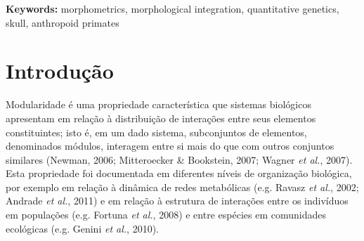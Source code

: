 \documentclass[12pt,twoside]{report}
\renewcommand{\headrulewidth}{0pt}%
\begin{document}
\begin{small}

\end{small}

\noindent
\par
\vspace{1em}
\noindent\textbf{Keywords:} morphometrics, morphological integration, quantitative genetics, skull, anthropoid primates


\newpage

\tableofcontents
{\footnotesize \listoffigures}
\listoftables

\newpage



\def\sectionautorefname{Seção}
\def\chapterautorefname{Capítulo}
\def\figureautorefname{Figura}
\def\tableautorefname{Tabela}

\onehalfspacing

\pagestyle{fancy}

\renewcommand{\chaptermark}[1]{\markboth{#1}{}}
\renewcommand{\sectionmark}[1]{\markright{#1}{}}

\fancyhf{} \fancyhead[RO]{\itshape \leftmark}
\fancyhead[LE]{\itshape \rightmark} \fancyfoot[RO,LE]{\thepage}
\renewcommand{\headrulewidth}{0.5pt} \renewcommand{\footrulewidth}{0pt}

\linenumbers
\modulolinenumbers[5]

\newpage
\chapter{Introdução}
\label{ch:intro}

Modularidade é uma propriedade característica que sistemas biológicos
apresentam em relação à distribuição de interações entre seus elementos
constituintes; isto é, em um dado sistema, subconjuntos de elementos,
denominados módulos, interagem entre si mais do que com outros conjuntos
similares (Newman, 2006; Mitteroecker \& Bookstein, 2007; Wagner
\emph{et al.}, 2007). Esta propriedade foi documentada em diferentes
níveis de organização biológica, por exemplo em relação à dinâmica de
redes metabólicas (e.g. Ravasz \emph{et al.}, 2002; Andrade \emph{et
al.}, 2011) e em relação à estrutura de interações entre os indivíduos
em populações (e.g. Fortuna \emph{et al.}, 2008) e entre espécies em
comunidades ecológicas (e.g. Genini \emph{et al.}, 2010).
\end{document}
